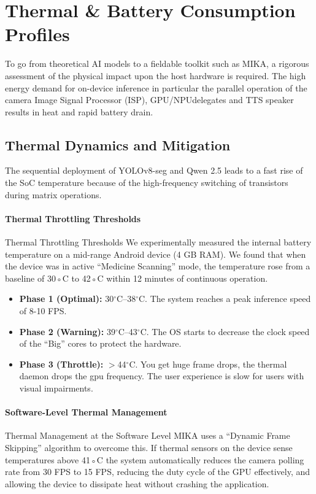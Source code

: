 \documentclass[12pt,a4paper]{report}
\begin{document}
\section{Thermal \& Battery Consumption Profiles}
 
To go from theoretical AI models to a fieldable toolkit such as MIKA, a rigorous assessment of the physical impact upon the host hardware is required. The high energy demand for on-device inference in particular the parallel operation of the camera Image Signal Processor (ISP), GPU/NPUdelegates and TTS speaker results in heat and rapid battery drain.
\subsection{Thermal Dynamics and Mitigation}
 
The sequential deployment of YOLOv8-seg and Qwen 2.5 leads to a fast rise of the SoC temperature because of the high-frequency switching of transistors during matrix operations.
 
\paragraph{Thermal Throttling Thresholds}
Thermal Throttling Thresholds We experimentally measured the internal battery temperature on a mid-range Android device (4 GB RAM). We found that when the device was in active “Medicine Scanning” mode, the temperature rose from a baseline of 30◦C to 42◦C within 12 minutes of continuous operation.

\begin{itemize}
    \item \textbf{Phase 1 (Optimal):} 30$^\circ$C--38$^\circ$C. The system reaches a peak inference speed of 8-10 FPS. 
    \item \textbf{Phase 2 (Warning):} 39$^\circ$C--43$^\circ$C. The OS starts to decrease the clock speed of the “Big” cores to protect the hardware. 
    \item \textbf{Phase 3 (Throttle):} $>$44$^\circ$C. You get huge frame drops, the thermal daemon drops the gpu frequency. The user experience is slow for users with visual impairments.
\end{itemize}
 
\paragraph{Software-Level Thermal Management}
Thermal Management at the Software Level MIKA uses a “Dynamic Frame Skipping” algorithm to overcome this. If thermal sensors on the device sense temperatures above 41◦C the system automatically reduces the camera polling rate from 30 FPS to 15 FPS, reducing the duty cycle of the GPU effectively, and allowing the device to dissipate heat without crashing the application. 
\end{document}
